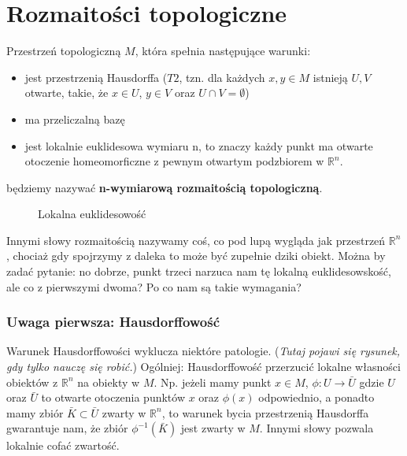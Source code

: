 \section{Rozmaitości topologiczne}
\begin{definition}
	Przestrzeń topologiczną $M$, która spełnia następujące warunki:
	\begin{itemize}
		\item jest przestrzenią Hausdorffa ($T2$, tzn. dla każdych $x,y \in M$ istnieją $U, V$ otwarte, takie, że $x \in U$, $y \in V$ oraz $U \cap V = \emptyset$)
		\item ma przeliczalną bazę
		\item jest lokalnie euklidesowa wymiaru n, to znaczy każdy punkt ma otwarte otoczenie homeomorficzne z pewnym otwartym podzbiorem w $\mathbb{R}^n$.
	\end{itemize}
	będziemy nazywać \textbf{n-wymiarową rozmaitością topologiczną}.
\end{definition}

\begin{figure}[ht]
	    \centering
		    \caption{Lokalna euklidesowość}
		    \label{fig:rozmaitosc}
\end{figure}

Innymi słowy rozmaitością nazywamy coś, co pod lupą wygląda jak przestrzeń $\mathbb{R}^n$, chociaż gdy spojrzymy z daleka to może być zupełnie dziki obiekt. Można by zadać pytanie: no dobrze, punkt trzeci narzuca nam tę lokalną euklidesowskość, ale co z pierwszymi dwoma? Po co nam są takie wymagania?

\subsubsection{Uwaga pierwsza: Hausdorffowość}
Warunek Hausdorffowości wyklucza niektóre patologie. (\textit{Tutaj pojawi się rysunek, gdy tylko nauczę się robić.}) Ogólniej: Hausdorffowość przerzucić lokalne własności obiektów z $\mathbb{R}^n$ na obiekty w $M$. Np. jeżeli mamy punkt $x \in M$, $\phi : U \to \bar{U}$  gdzie $U$ oraz $\bar{U}$ to otwarte otoczenia punktów $x$ oraz $\phi(x)$ odpowiednio, a ponadto mamy zbiór $\bar{K} \subset \bar{U}$ zwarty w $\mathbb{R}^n$, to warunek bycia przestrzenią Hausdorffa gwarantuje nam, że zbiór $\phi^{-1}\left(\bar{K}\right)$ jest zwarty w $M$. Innymi słowy pozwala lokalnie cofać zwartość.

